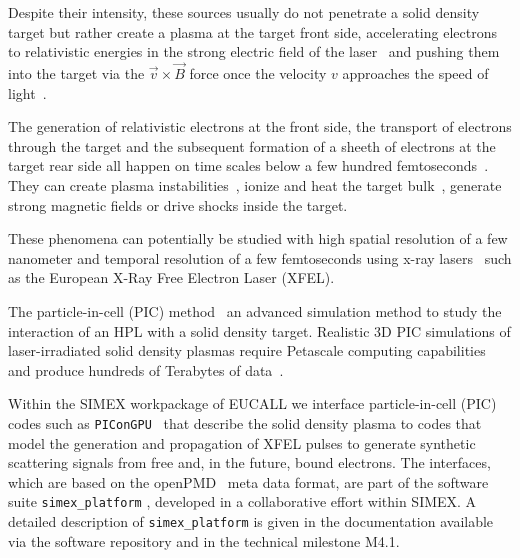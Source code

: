 \documentclass[12pt]{scrartcl}
\begin{document}
Despite their intensity, these sources usually do not penetrate a solid density
target but rather create a plasma at the target front side, accelerating
electrons to relativistic energies in the strong electric field of the
laser~\cite{Kluge2011} and pushing them into the target via the
$\vec{v}\times\vec{B}$ force once the velocity $v$ approaches the speed of
light~\cite{Mulser2010,Gibbon1996}.

The generation of relativistic electrons at the front side, the transport of
electrons through the target and the subsequent formation of a sheeth of
electrons at the target rear side all happen on time scales below a few hundred
femtoseconds~\cite{Macchi2013}. They can create plasma
instabilities~\cite{Metzkes2014}, ionize and heat the target
bulk~\cite{Huang2013}, generate strong magnetic fields or drive shocks inside
the target.

These phenomena can potentially be studied with high spatial resolution of a few
nanometer and temporal resolution of a few femtoseconds using x-ray
lasers~\cite{Kluge2014,Kluge2016} such as the European X-Ray Free Electron
Laser (XFEL).

The particle-in-cell (PIC) method~\cite{Birdsall2004} an advanced simulation
method to study the interaction of an HPL with a solid density
target. Realistic 3D PIC simulations of laser-irradiated solid
density plasmas require Petascale computing capabilities and produce hundreds of
Terabytes of data~\cite{ornl_picongpu}.

Within the SIMEX workpackage of EUCALL we interface particle-in-cell (PIC) codes
such as \texttt{PIConGPU}~\cite{Bussmann2013, picongpu_github} that describe the solid density plasma to codes that
model the generation and propagation of XFEL pulses to
generate synthetic scattering signals from free and, in the future, bound
electrons. The interfaces, which are based on the openPMD~\cite{openPMD} meta data format, are
part of the software suite \texttt{simex\_platform} \cite{simex_github},
developed in a collaborative effort within SIMEX. A detailed description of
\texttt{simex\_platform} is given in the documentation available via the
software repository \cite{simex_github} and in the technical
milestone M4.1.
\end{document}
